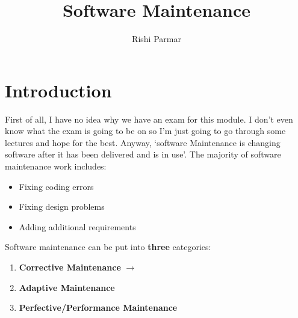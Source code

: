 \documentclass{article}
\begin{document}
\title{Software Maintenance}
\author{Rishi Parmar}
\maketitle
\newpage
{}
\hypertarget{MyToc}{}
\tableofcontents
\newpage

\section{Introduction}
First of all, I have no idea why we have an exam for this module. I don't even know what the exam is going to be on so I'm just going to go through some lectures and hope for the best. Anyway, `software Maintenance is changing software after it has been delivered and is in use'. The majority of software maintenance work includes: 

\begin{itemize}
\item Fixing coding errors
\item Fixing design problems
\item Adding additional requirements
\end{itemize}

Software maintenance can be put into \textbf{three} categories:

\begin{enumerate}
\item \textbf{Corrective Maintenance} $\longrightarrow$
\item \textbf{Adaptive Maintenance}
\item \textbf{Perfective/Performance Maintenance}
\end{enumerate}
\end{document}
